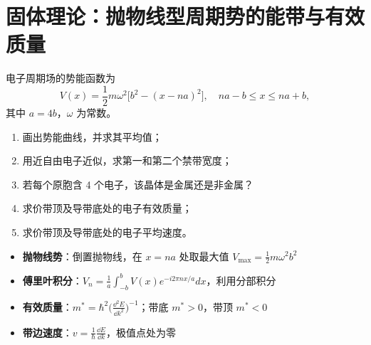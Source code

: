 \section{固体理论：抛物线型周期势的能带与有效质量}
\label{sec:parabolic-potential-band}

\begin{modelbox}[题目：抛物线型周期势的近自由电子能带与有效质量]
电子周期场的势能函数为
\[
V(x)=\frac{1}{2}m\omega^2\bigl[b^2-(x-na)^2\bigr],\quad na-b\le x\le na+b,
\]
其中 $a=4b$，$\omega$ 为常数。
\begin{enumerate}
    \item 画出势能曲线，并求其平均值；
    \item 用近自由电子近似，求第一和第二个禁带宽度；
    \item 若每个原胞含 4 个电子，该晶体是金属还是非金属？
    \item 求价带顶及导带底处的电子有效质量；
    \item 求价带顶及导带底处的电子平均速度。
\end{enumerate}
\end{modelbox}

\begin{tipbox}[考点快速分析]
\begin{itemize}
    \item \textbf{抛物线势}：倒置抛物线，在 $x=na$ 处取最大值 $V_{\max}=\frac12m\omega^2b^2$
    \item \textbf{傅里叶积分}：$V_n=\frac{1}{a}\int_{-b}^{b}V(x)e^{-i2\pi nx/a}dx$，利用分部积分
    \item \textbf{有效质量}：$m^*=\hbar^2\bigl(\frac{\dd^2E}{\dd k^2}\bigr)^{-1}$；带底 $m^*>0$，带顶 $m^*<0$
    \item \textbf{带边速度}：$v=\frac{1}{\hbar}\frac{\dd E}{\dd k}$，极值点处为零
\end{itemize}
\end{tipbox}

